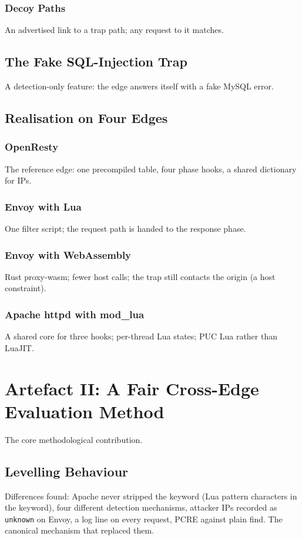\documentclass{rptuma}
\begin{document}
\subsection{Decoy Paths}
An advertised link to a trap path; any request to it matches.
\section{The Fake SQL-Injection Trap}
A detection-only feature: the edge answers itself with a fake MySQL error.
\section{Realisation on Four Edges}
\subsection{OpenResty}
The reference edge: one precompiled table, four phase hooks, a shared dictionary for IPs.
\subsection{Envoy with Lua}
One filter script; the request path is handed to the response phase.
\subsection{Envoy with WebAssembly}
Rust proxy-wasm; fewer host calls; the trap still contacts the origin (a host constraint).
\subsection{Apache httpd with mod\_lua}
A shared core for three hooks; per-thread Lua states; PUC Lua rather than LuaJIT.

\chapter{Artefact II: A Fair Cross-Edge Evaluation Method}
The core methodological contribution.

\section{Levelling Behaviour}
Differences found: Apache never stripped the keyword (Lua pattern characters in the keyword),
four different detection mechanisms, attacker IPs recorded as \texttt{unknown} on Envoy, a log
line on every request, PCRE against plain find. The canonical mechanism that replaced them.
\end{document}
